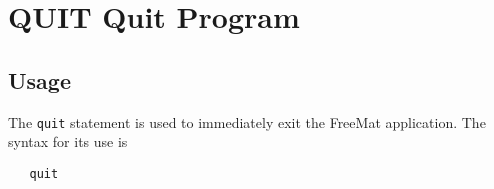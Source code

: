 \section{QUIT Quit Program}

\subsection{Usage}

The \verb|quit| statement is used to immediately exit the FreeMat
application.  The syntax for its use is
\begin{verbatim}
   quit
\end{verbatim}
